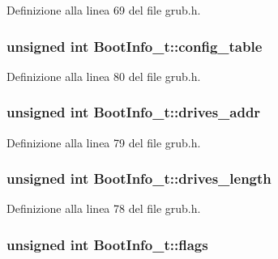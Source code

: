 Definizione alla linea 69 del file grub.\+h.

\hypertarget{structBootInfo__t_a43ae8547b0cea379829329a622d9bc4c}{
\subsubsection[{config\+\_\+table}]{\setlength{\rightskip}{0pt plus 5cm}unsigned int Boot\+Info\+\_\+t\+::config\+\_\+table}}\label{structBootInfo__t_a43ae8547b0cea379829329a622d9bc4c}


Definizione alla linea 80 del file grub.\+h.

\hypertarget{structBootInfo__t_aa355db96d835f264c29a00f15ba126bf}{
\subsubsection[{drives\+\_\+addr}]{\setlength{\rightskip}{0pt plus 5cm}unsigned int Boot\+Info\+\_\+t\+::drives\+\_\+addr}}\label{structBootInfo__t_aa355db96d835f264c29a00f15ba126bf}


Definizione alla linea 79 del file grub.\+h.

\hypertarget{structBootInfo__t_adc0745eb234059fc6eb37d8a6c18e4b4}{
\subsubsection[{drives\+\_\+length}]{\setlength{\rightskip}{0pt plus 5cm}unsigned int Boot\+Info\+\_\+t\+::drives\+\_\+length}}\label{structBootInfo__t_adc0745eb234059fc6eb37d8a6c18e4b4}


Definizione alla linea 78 del file grub.\+h.

\hypertarget{structBootInfo__t_a255b75459b2ed645abe749075f3ca25d}{
\subsubsection[{flags}]{\setlength{\rightskip}{0pt plus 5cm}unsigned int Boot\+Info\+\_\+t\+::flags}}\label{structBootInfo__t_a255b75459b2ed645abe749075f3ca25d}


